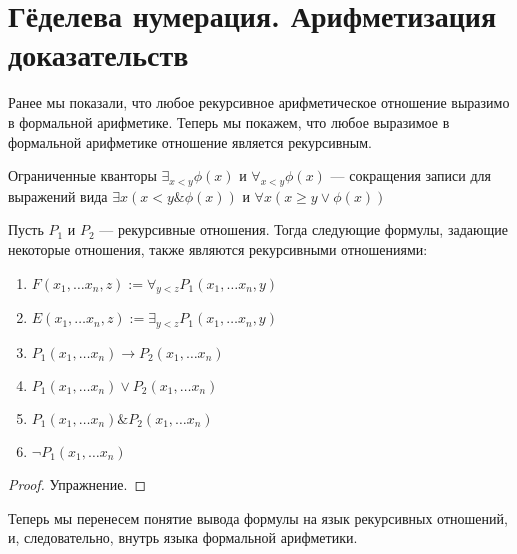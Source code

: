 \section{Гёделева нумерация. Арифметизация доказательств}

Ранее мы показали, что любое рекурсивное арифметическое отношение 
выразимо в формальной арифметике. Теперь мы покажем, что 
любое выразимое в формальной арифметике отношение является рекурсивным.

\begin{definition} Ограниченные кванторы $\exists_{x<y} \phi(x)$ и
$\forall_{x<y} \phi(x)$ --- сокращения записи для выражений вида 
$\exists x (x < y \& \phi(x))$ и $\forall x (x \ge y \vee \phi (x))$
\end{definition}

\begin{theorem} Пусть $P_1$ и $P_2$ --- рекурсивные отношения.
Тогда следующие формулы, задающие некоторые отношения, также являются 
рекурсивными отношениями:

\begin{enumerate}
\item $F(x_1,\dots x_n,z) := \forall_{y<z} P_1(x_1,\dots x_n,y)$
\item $E(x_1, \dots x_n,z) := \exists_{y<z} P_1(x_1,\dots x_n,y)$
\item $P_1(x_1,\dots x_n) \rightarrow P_2(x_1,\dots x_n)$
\item $P_1(x_1,\dots x_n) \vee P_2(x_1,\dots x_n)$
\item $P_1(x_1,\dots x_n) \& P_2(x_1,\dots x_n)$
\item $\neg P_1(x_1, \dots x_n)$
\end{enumerate}
\end{theorem}

\begin{proof}Упражнение.
\end{proof}

Теперь мы перенесем понятие вывода формулы на язык рекурсивных отношений,
и, следовательно, внутрь языка формальной арифметики.

